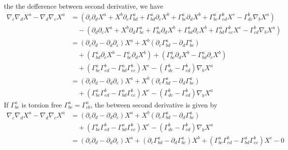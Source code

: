 the the defference between second derivative, we have
\begin{equation}
\begin{aligned}
\nabla_{c}\nabla_{d} X^{a} - \nabla_{d}\nabla_{c} X^{a}
&= \left(\partial_{c}\partial_{d}X^{a}
+ X^{b}\partial_{c}\Gamma^{a}_{bd} + \Gamma^{a}_{bd}\partial_{c}X^{b}
+ \Gamma^{a}_{bc}\partial_{d}X^{b}
+ \Gamma^{a}_{bc}\Gamma^{b}_{ed}X^{e}
- \Gamma^{b}_{dc} \nabla_{b} X^{a}\right)\\
&\quad - \left(\partial_{d}\partial_{c}X^{a}
+ X^{b}\partial_{d}\Gamma^{a}_{bc} + \Gamma^{a}_{bc}\partial_{d}X^{b}
+ \Gamma^{a}_{bd}\partial_{c}X^{b}
+ \Gamma^{a}_{bd}\Gamma^{b}_{ec}X^{e}
- \Gamma^{b}_{cd} \nabla_{b} X^{a}\right)\\
&= \left(\partial_{c}\partial_{d}-\partial_{d}\partial_{c}\right)X^{a}
+ X^{b}\left(\partial_{c}\Gamma^{a}_{bd}-\partial_{d}\Gamma^{a}_{bc}\right)\\
&\quad+ \left(\Gamma^{a}_{bd}\partial_{c}X^{b} - \Gamma^{a}_{bc}\partial_{d}X^{b}\right)
+\left(\Gamma^{a}_{bc}\partial_{d}X^{b} - \Gamma^{a}_{bd}\partial_{c}X^{b}\right)\\
&\quad +\left(\Gamma^{a}_{bc}\Gamma^{b}_{ed}- \Gamma^{a}_{bd}\Gamma^{b}_{ec}\right)X^{e}
- \left(\Gamma^{b}_{dc} - \Gamma^{b}_{cd}\right)\nabla_{b}X^{a}\\
&= \left(\partial_{c}\partial_{d}-\partial_{d}\partial_{c}\right)X^{a}
+ X^{b}\left(\partial_{c}\Gamma^{a}_{bd}-\partial_{d}\Gamma^{a}_{bc}\right)\\
&\quad +\left(\Gamma^{a}_{bc}\Gamma^{b}_{ed}- \Gamma^{a}_{bd}\Gamma^{b}_{ec}\right)X^{e}
- \left(\Gamma^{b}_{dc} - \Gamma^{b}_{cd}\right)\nabla_{b}X^{a}
\end{aligned}
\end{equation}
If $\Gamma^{a}_{bc}$ is torsion free $\Gamma^{a}_{bc} = \Gamma^{a}_{cb}$, the between second derivative is given by
\begin{equation}
\begin{aligned}
\nabla_{c}\nabla_{d} X^{a} - \nabla_{d}\nabla_{c} X^{a}
&= \left(\partial_{c}\partial_{d}-\partial_{d}\partial_{c}\right)X^{a}
+ X^{b}\left(\partial_{c}\Gamma^{a}_{bd}-\partial_{d}\Gamma^{a}_{bc}\right)\\
&\quad +\left(\Gamma^{a}_{bc}\Gamma^{b}_{ed}- \Gamma^{a}_{bd}\Gamma^{b}_{ec}\right)X^{e}
- \left(\Gamma^{b}_{dc} - \Gamma^{b}_{cd}\right)\nabla_{b}X^{a}\\
&= \left(\partial_{c}\partial_{d}-\partial_{d}\partial_{c}\right)X^{a}
+ \left(\partial_{c}\Gamma^{a}_{bd}-\partial_{d}\Gamma^{a}_{bc}\right)X^{b}
+\left(\Gamma^{a}_{bc}\Gamma^{b}_{ed}- \Gamma^{a}_{bd}\Gamma^{b}_{ec}\right)X^{e}
- 0
\end{aligned}
\end{equation}
